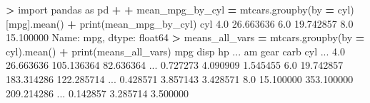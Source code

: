 \documentclass[
]{book}
\newenvironment{Shaded}{\begin{snugshade}}{\end{snugshade}}
\newcommand{\BuiltInTok}[1]{#1}
\newcommand{\FloatTok}[1]{\textcolor[rgb]{0.00,0.00,0.81}{#1}}
\newcommand{\ImportTok}[1]{#1}
\newcommand{\NormalTok}[1]{#1}
\newcommand{\OperatorTok}[1]{\textcolor[rgb]{0.81,0.36,0.00}{\textbf{#1}}}
\newcommand{\StringTok}[1]{\textcolor[rgb]{0.31,0.60,0.02}{#1}}
\begin{document}
\begin{Shaded}
\begin{Highlighting}[]
\OperatorTok{\textgreater{}} \ImportTok{import}\NormalTok{ pandas }\ImportTok{as}\NormalTok{ pd}
\OperatorTok{+} 
\OperatorTok{+}\NormalTok{ mean\_mpg\_by\_cyl }\OperatorTok{=}\NormalTok{ mtcars.groupby(by }\OperatorTok{=} \StringTok{\textquotesingle{}cyl\textquotesingle{}}\NormalTok{)[}\StringTok{\textquotesingle{}mpg\textquotesingle{}}\NormalTok{].mean()}
\OperatorTok{+} \BuiltInTok{print}\NormalTok{(mean\_mpg\_by\_cyl)}
\NormalTok{cyl}
\FloatTok{4.0}    \FloatTok{26.663636}
\FloatTok{6.0}    \FloatTok{19.742857}
\FloatTok{8.0}    \FloatTok{15.100000}
\NormalTok{Name: mpg, dtype: float64}
\OperatorTok{\textgreater{}}\NormalTok{ means\_all\_vars }\OperatorTok{=}\NormalTok{ mtcars.groupby(by }\OperatorTok{=} \StringTok{\textquotesingle{}cyl\textquotesingle{}}\NormalTok{).mean()}
\OperatorTok{+} \BuiltInTok{print}\NormalTok{(means\_all\_vars)}
\NormalTok{           mpg        disp          hp  ...        am      gear      carb}
\NormalTok{cyl                                     ...                              }
\FloatTok{4.0}  \FloatTok{26.663636}  \FloatTok{105.136364}   \FloatTok{82.636364}\NormalTok{  ...  }\FloatTok{0.727273}  \FloatTok{4.090909}  \FloatTok{1.545455}
\FloatTok{6.0}  \FloatTok{19.742857}  \FloatTok{183.314286}  \FloatTok{122.285714}\NormalTok{  ...  }\FloatTok{0.428571}  \FloatTok{3.857143}  \FloatTok{3.428571}
\FloatTok{8.0}  \FloatTok{15.100000}  \FloatTok{353.100000}  \FloatTok{209.214286}\NormalTok{  ...  }\FloatTok{0.142857}  \FloatTok{3.285714}  \FloatTok{3.500000}


\end{Highlighting}
\end{Shaded}
\end{document}
